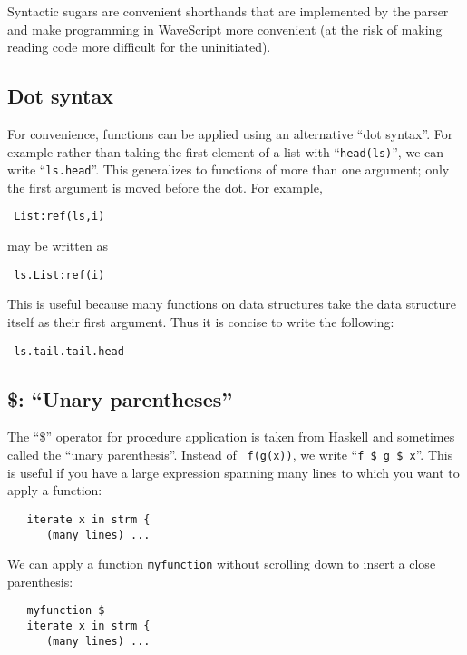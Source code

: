 \documentclass[twocolumn]{report}
\newcommand{\cd}{\tt}
\newenvironment{wscode}{\begin{center}\tt}{\end{center}}
\begin{document}
Syntactic sugars are convenient shorthands that are implemented by the
parser and make programming in WaveScript more convenient (at the risk
of making reading code more difficult for the uninitiated).

\subsection{Dot syntax}
  For convenience, functions can be applied using an
alternative ``dot syntax''.  For example rather than taking the first
element of a list with ``{\cd head(ls)}'', we can write ``{\cd ls.head}''.
This generalizes to functions of more than one argument; only the
first argument is moved before the dot.  For example, 
\vspace{-2mm}
\begin{wscode}
List:ref(ls,i)
\end{wscode}
\vspace{-2mm}
 may be written as 
\vspace{-2mm}
\begin{wscode}
ls.List:ref(i)
\end{wscode}
\vspace{-2mm}
This is useful because many functions on data structures take the
data structure itself as their first argument.  Thus it is concise to
write the following:
\vspace{-2mm}
\begin{wscode}
ls.tail.tail.head
\end{wscode}
\vspace{-2mm}


\subsection{\$: ``Unary parentheses''}

The ``\$'' operator for procedure application is taken from Haskell
and sometimes called the ``unary parenthesis''.  Instead of {\cd
  f(g(x))}, we write ``{\cd f \$ g \$ x}''.
This is useful if you have a large expression spanning many lines to
which you want to apply a function:
\begin{verbatim}
   iterate x in strm { 
      (many lines) ... 
\end{verbatim}
We can apply a function {\cd myfunction} without scrolling down to
insert a close parenthesis:
\begin{verbatim}
   myfunction $
   iterate x in strm { 
      (many lines) ... 
\end{verbatim}
\end{document}
